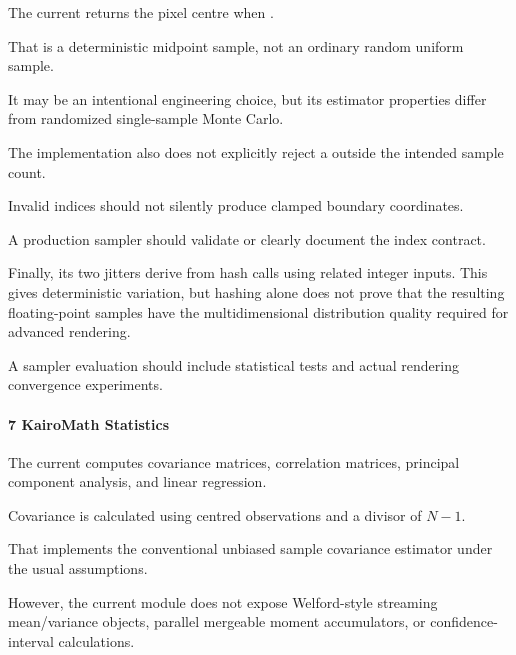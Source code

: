\hypertarget{02-foundations-ii-ch039-other-renderer-checks}{}

The current  returns the pixel centre when .

That is a deterministic midpoint sample, not an ordinary random uniform sample.

It may be an intentional engineering choice, but its estimator properties differ from randomized single-sample Monte Carlo.

The implementation also does not explicitly reject a  outside the intended sample count.

Invalid indices should not silently produce clamped boundary coordinates.

A production sampler should validate or clearly document the index contract.

Finally, its two jitters derive from hash calls using related integer inputs. This gives deterministic variation, but hashing alone does not prove that the resulting floating-point samples have the multidimensional distribution quality required for advanced rendering.

A sampler evaluation should include statistical tests and actual rendering convergence experiments.

\paragraph{7 KairoMath Statistics}\label{02-foundations-ii-ch039-kairomath-statistics}

\hypertarget{02-foundations-ii-ch039-kairomath-statistics}{}

The current  computes covariance matrices, correlation matrices, principal component analysis, and linear regression.

Covariance is calculated using centred observations and a divisor of \(N-1\).

That implements the conventional unbiased sample covariance estimator under the usual assumptions.

However, the current module does not expose Welford-style streaming mean/variance objects, parallel mergeable moment accumulators, or confidence-interval calculations.

